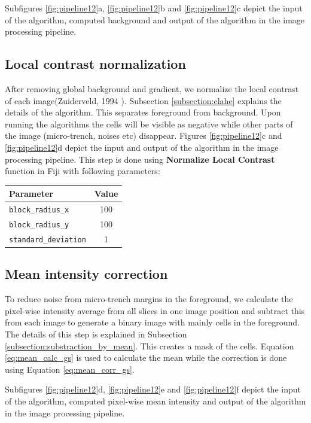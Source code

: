 \documentclass[pdftex,12pt,a4paper]{report}
\begin{document}
Subfigures \ref{fig:pipeline12}a, \ref{fig:pipeline12}b and \ref{fig:pipeline12}c depict the input of the algorithm, computed background and output of the algorithm in the image processing pipeline.

\subsection{Local contrast normalization}

After removing global background and gradient, we normalize the local contrast of each image(Zuiderveld, 1994  \cite{zuiderveld1994contrast}). Subsection \ref{subsection:clahe} explains the details of  the algorithm. This separates foreground from background. Upon running the algorithms the cells will be visible as negative while other parts of the image (micro-trench, noises etc) disappear. Figures \ref{fig:pipeline12}c and \ref{fig:pipeline12}d depict the input and output of the algorithm in the image processing pipeline. This step is done using \textbf{Normalize Local Contrast} function in Fiji with following parameters:

\begin{table}[H]
\centering
\begin{tabular}[t]{ l | c }
\hline
Parameter & Value \\
\hline\hline
\texttt{block\_radius\_x} & 100 \\
\texttt{block\_radius\_y} & 100 \\
\texttt{standard\_deviation} & 1 \\
\hline
\end{tabular}
\end{table}

\subsection{Mean intensity correction}
\label{subsection:mean_intensity_correction}

To reduce noise from micro-trench margins in the foreground, we calculate the pixel-wise intensity average from all slices in one image position and subtract this from each image to generate a binary image with mainly cells in the foreground. The details of this step is explained in Subsection \ref{subsection:substraction_by_mean}. This creates a mask of the cells.  Equation \ref{eq:mean_calc_gs} is used to calculate the mean while the correction is done using Equation \ref{eq:mean_corr_gs}.

Subfigures \ref{fig:pipeline12}d, \ref{fig:pipeline12}e and \ref{fig:pipeline12}f depict the input of the algorithm, computed pixel-wise mean intensity and output of the algorithm in the image processing pipeline.
\end{document}
